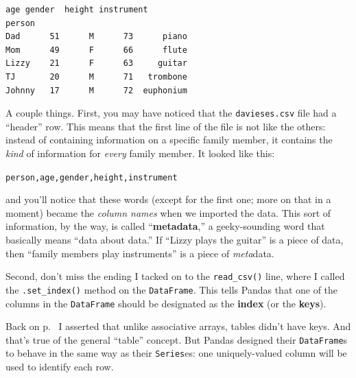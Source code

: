 \begin{Verbatim}[fontsize=\small,samepage=true,frame=leftline,framesep=5mm,framerule=1mm]
        age gender  height instrument
person                               
Dad      51      M      73      piano
Mom      49      F      66      flute
Lizzy    21      F      63     guitar
TJ       20      M      71   trombone
Johnny   17      M      72  euphonium
\end{Verbatim}


A couple things. First, you may have noticed that the \texttt{davieses.csv}
file had a ``header'' row. This means that the first line of the file is not
like the others: instead of containing information on a specific family member,
it contains the \textit{kind} of information for \textit{every} family member.
It looked like this:

\vspace{-.1in}
\begin{center}
\texttt{person,age,gender,height,instrument}
\end{center}
\vspace{-.1in}


and you'll notice that these words (except for the first one; more on that in a
moment) became the \textit{column names} when we imported the data. This sort
of information, by the way, is called ``\textbf{metadata},'' a geeky-sounding
word that basically means ``data about data.'' If ``Lizzy plays the guitar'' is
a piece of data, then ``family members play instruments'' is a piece of
\textit{meta}data.


Second, don't miss the ending I tacked on to the \texttt{read\_csv()} line,
where I called the \texttt{.set\_index()} method on the \texttt{DataFrame}.
This tells Pandas that one of the columns in the \texttt{DataFrame} should be
designated as the \textbf{index} (or the \textbf{keys}).


Back on p.~\pageref{tablesHaveNoKey} I asserted that unlike associative arrays,
tables didn't have keys. And that's true of the general ``table'' concept. But
Pandas designed their \texttt{DataFrame}s to behave in the same way as their
\texttt{Series}es: one uniquely-valued column will be used to identify each
row.

